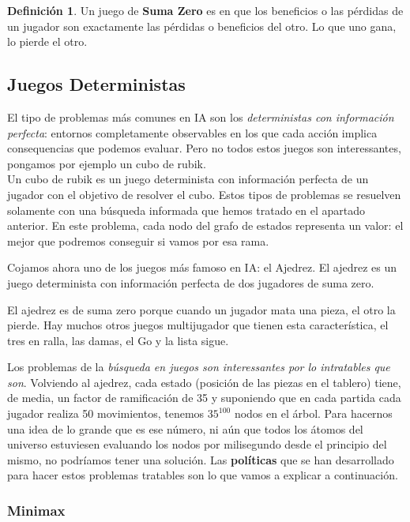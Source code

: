 \documentclass[12pt,a4paper,catalan, leqno]{article} %
\theoremstyle{definition}
\newtheorem{defn}{Definición}[section]
\begin{document}
\begin{defn}
Un juego de \textbf{Suma Zero} es en que los beneficios o las pérdidas de un jugador son exactamente las pérdidas o beneficios del otro. Lo que uno gana, lo pierde el otro.
\end{defn}

\subsection{Juegos Deterministas}

El tipo de problemas más comunes en IA son los \textit{deterministas con información perfecta}: entornos completamente observables en los que cada acción implica consequencias que podemos evaluar. Pero no todos estos juegos son interessantes, pongamos por ejemplo un cubo de rubik.\\
Un cubo de rubik es un juego determinista con información perfecta de un jugador con el objetivo de resolver el cubo. Estos tipos de problemas se resuelven solamente con una búsqueda informada que hemos tratado en el apartado anterior. En este problema, cada nodo del grafo de estados representa un valor: el mejor que podremos conseguir si vamos por esa rama.

Cojamos ahora uno de los juegos más famoso en IA: el Ajedrez. El ajedrez es un juego determinista con información perfecta de dos jugadores de suma zero.

El ajedrez es de suma zero porque cuando un jugador mata una pieza, el otro la pierde. Hay muchos otros juegos multijugador que tienen esta característica, el tres en ralla, las damas, el Go y la lista sigue.

Los problemas de la \textit{búsqueda en juegos son interessantes por lo intratables que son}. Volviendo al ajedrez, cada estado (posición de las piezas en el tablero) tiene, de media, un factor de ramificación de 35 y suponiendo que en cada partida cada jugador realiza 50 movimientos, tenemos $35^{100}$ nodos en el árbol. Para hacernos una idea de lo grande que es ese número, ni aún que todos los átomos del universo estuviesen evaluando los nodos por milisegundo desde el principio del mismo, no podríamos tener una solución. Las \textbf{políticas} que se han desarrollado para hacer estos problemas tratables son lo que vamos a explicar a continuación.

\subsubsection{Minimax}
\end{document}
